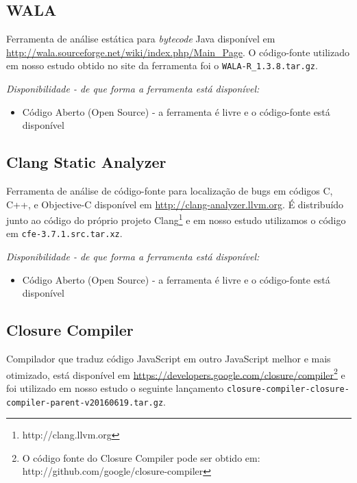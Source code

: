\subsection{WALA}

Ferramenta de análise estática para {\it bytecode} Java disponível em
\url{http://wala.sourceforge.net/wiki/index.php/Main_Page}. O código-fonte
utilizado em nosso estudo obtido no site da ferramenta foi o
\texttt{WALA-R\_1.3.8.tar.gz}.

\begin{description}

  \item {\it Disponibilidade - de que forma a ferramenta está disponível:}
    \begin{itemize}
      \item Código Aberto (Open Source) - a ferramenta é livre e o código-fonte está disponível
    \end{itemize}

\end{description}

\subsection{Clang Static Analyzer}

Ferramenta de análise de código-fonte para
localização de bugs em códigos C, C++, e Objective-C disponível em
\url{http://clang-analyzer.llvm.org}. É distribuído junto ao código do próprio
projeto Clang\footnote{http://clang.llvm.org} e em nosso estudo utilizamos o
código em \texttt{cfe-3.7.1.src.tar.xz}.

\begin{description}

  \item {\it Disponibilidade - de que forma a ferramenta está disponível:}
    \begin{itemize}
      \item Código Aberto (Open Source) - a ferramenta é livre e o código-fonte está disponível
    \end{itemize}

\end{description}

\subsection{Closure Compiler}

Compilador que traduz código JavaScript em outro
JavaScript melhor e mais otimizado, está disponível em
\url{https://developers.google.com/closure/compiler}\footnote{O código fonte do
Closure Compiler pode ser obtido em:
http://github.com/google/closure-compiler} e foi utilizado em nosso estudo o
seguinte lançamento
\texttt{closure-compiler-closure-compiler-parent-v20160619.tar.gz}.

